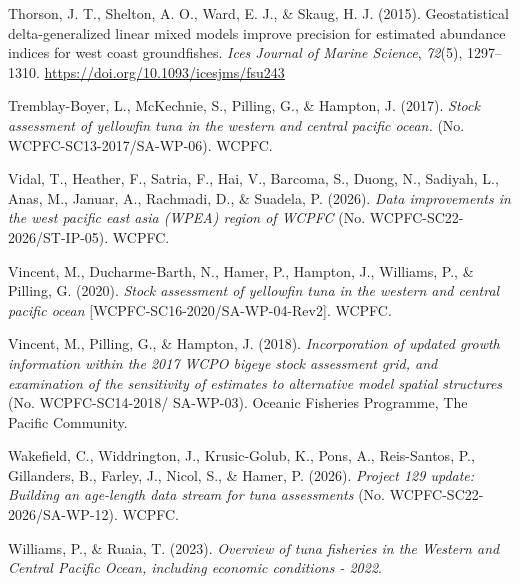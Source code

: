 \documentclass[
  english,
  a4paper,
  a4paper,
  11pt]{SCreport}
\newlength{\cslhangindent}
\newenvironment{CSLReferences}[2] %
 {\begin{list}{}{%
  \setlength{\itemindent}{0pt}
  \setlength{\leftmargin}{0pt}
  \setlength{\parsep}{0pt}
  \ifodd #1
   \setlength{\leftmargin}{\cslhangindent}
   \setlength{\itemindent}{-1\cslhangindent}
  \fi
  \setlength{\itemsep}{#2\baselineskip}}}
 {\end{list}}
\begin{document}
\begin{CSLReferences}{1}{0}
Thorson, J. T., Shelton, A. O., Ward, E. J., \& Skaug, H. J. (2015).
Geostatistical delta-generalized linear mixed models improve precision
for estimated abundance indices for west coast groundfishes. \emph{Ices
Journal of Marine Science}, \emph{72}(5), 1297--1310.
\url{https://doi.org/10.1093/icesjms/fsu243}

Tremblay-Boyer, L., McKechnie, S., Pilling, G., \& Hampton, J. (2017).
\emph{Stock assessment of yellowfin tuna in the western and central
pacific ocean.} (No. {WCPFC}-{SC}13-2017/{SA}-{WP}-06). WCPFC.

Vidal, T., Heather, F., Satria, F., Hai, V., Barcoma, S., Duong, N.,
Sadiyah, L., Anas, M., Januar, A., Rachmadi, D., \& Suadela, P. (2026).
\emph{Data improvements in the west pacific east asia ({WPEA}) region of
{WCPFC}} (No. {WCPFC}-{SC}22-2026/{ST}-{IP}-05). WCPFC.

Vincent, M., Ducharme-Barth, N., Hamer, P., Hampton, J., Williams, P.,
\& Pilling, G. (2020). \emph{Stock assessment of yellowfin tuna in the
western and central pacific ocean} {[}WCPFC-SC16-2020/SA-WP-04-Rev2{]}.
WCPFC.

Vincent, M., Pilling, G., \& Hampton, J. (2018). \emph{Incorporation of
updated growth information within the 2017 {WCPO} bigeye stock
assessment grid, and examination of the sensitivity of estimates to
alternative model spatial structures} (No. {WCPFC}-{SC}14-2018/
{SA}-{WP}-03). Oceanic Fisheries Programme, The Pacific Community.

Wakefield, C., Widdrington, J., Krusic-Golub, K., Pons, A., Reis-Santos,
P., Gillanders, B., Farley, J., Nicol, S., \& Hamer, P. (2026).
\emph{Project 129 update: Building an age-length data stream for tuna
assessments} (No. {WCPFC}-{SC}22-2026/{SA}-{WP}-12). WCPFC.

Williams, P., \& Ruaia, T. (2023). \emph{Overview of tuna fisheries in
the {Western} and {Central} {Pacific} {Ocean}, including economic
conditions - 2022}.

\end{CSLReferences}
\end{document}
